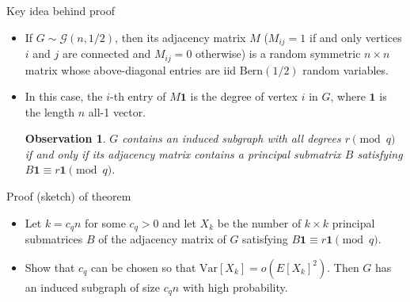 \documentclass{beamer}
\theoremstyle{plain}
\newtheorem{observation}[theorem]{Observation}
\newcommand{\Bern}{\text{Bern}}
\newcommand{\E}{\mathbb{E}}
\newcommand{\Var}{\text{Var}}
\begin{document}
	\begin{frame}{Key idea behind proof}
		\begin{itemize}
			\item If $G\sim \mathcal{G}(n, 1/2)$, then its adjacency matrix $M$ ($M_{ij} = 1$ if and only vertices $i$ and $j$ are connected and $M_{ij}=0$ otherwise) is a random symmetric $n\times n$ matrix whose above-diagonal entries are iid $\Bern(1/2)$ random variables.

			\pause

			\item In this case, the $i$-th entry of $M\boldsymbol{1}$ is the degree of vertex $i$ in $G$, where $\boldsymbol{1}$ is the length $n$ all-1 vector.

			\pause

			\begin{observation}
				$G$ contains an induced subgraph with all degrees $r\pmod q$ if and only if its adjacency matrix contains a principal submatrix $B$ satisfying $B\boldsymbol{1} \equiv r\boldsymbol{1}\pmod q$.
			\end{observation}
		\end{itemize}
	\end{frame}


	\begin{frame}{Proof (sketch) of theorem}
		\begin{itemize}
			\begin{theorem}
				Let $X$ be a nonnegative integer-valued random variable with finite variance.
				Then
				\[
					\Pr[X > 0] \geq 1 - \frac{\Var[X]}{(\E[X])^2}.
				\]

			\end{theorem}

			\pause

			\item Let $k = c_qn$ for some $c_q>0$ and let $X_k$ be the number of $k\times k$ principal submatrices $B$ of the adjacency matrix of $G$ satisfying $B\boldsymbol{1} \equiv r\boldsymbol{1} \pmod {q}$.

			\pause

			\item Show that $c_q$ can be chosen so that $\Var[X_k] = o(E[X_k]^2)$.
			Then $G$ has an induced subgraph of size $c_qn$ with high probability.
		\end{itemize}
	\end{frame}
\end{document}
